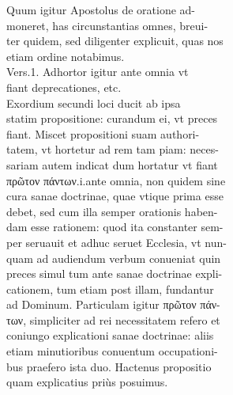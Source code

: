 \documentclass{article}
\begin{document}
\begin{pages}
                Quum igitur Apostolus de oratione ad- \\
                moneret, has circunstantias omnes, breui- \\
                ter quidem, sed diligenter explicuit, quas nos \\
                etiam ordine notabimus. \\
                Vers.1. Adhortor igitur ante omnia vt \\
                fiant deprecationes, etc. \\
                Exordium secundi loci ducit ab ipsa \\
                statim propositione: curandum ei, vt preces \\
                fiant. Miscet propositioni suam authori- \\
                tatem, vt hortetur ad rem tam piam: neces- \\
                sariam autem indicat dum hortatur vt fiant \\
                πρῶτον πάντων.i.ante omnia, non quidem sine \\
                cura sanae doctrinae, quae vtique prima esse \\
                debet, sed cum illa semper orationis haben- \\
                dam esse rationem: quod ita constanter sem- \\
                per seruauit et adhuc seruet Ecclesia, vt nun- \\
                quam ad audiendum verbum conueniat quin \\
                preces simul tum ante sanae doctrinae expli- \\
                cationem, tum etiam post illam, fundantur \\
                ad Dominum. Particulam igitur πρῶτον πάν- \\
                των, simpliciter ad rei necessitatem refero et \\
                coniungo explicationi sanae doctrinae: aliis \\
                etiam minutioribus conuentum occupationi- \\
                bus praefero ista duo. Hactenus propositio \\
                quam explicatius priùs posuimus. \\

\end{pages}
\end{document}
